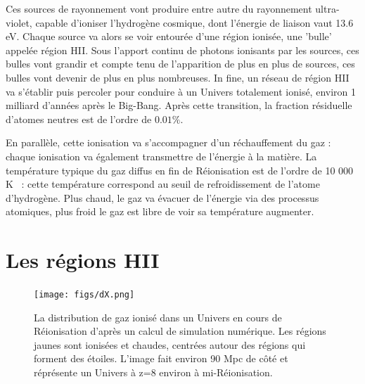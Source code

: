 Ces sources de rayonnement vont produire entre autre du rayonnement ultra-violet, capable d'ioniser l'hydrogène cosmique, dont l'énergie de liaison vaut 13.6 eV. Chaque source va alors se voir entourée d'une région ionisée, une 'bulle' appelée région HII. Sous l'apport continu de photons ionisants par les sources, ces bulles vont grandir et compte tenu de l'apparition de plus en plus de sources, ces bulles vont devenir de plus en plus nombreuses. In fine, un réseau de région HII va s'établir puis percoler pour conduire à un Univers totalement ionisé, environ 1 milliard d'années après le Big-Bang. Après cette transition, la fraction résiduelle d'atomes neutres est de l'ordre de $0.01\%$.

En parallèle, cette ionisation va s'accompagner d'un réchauffement du gaz : chaque ionisation va également transmettre de l'énergie à la matière. La température typique du gaz diffus en fin de Réionisation est de l'ordre de 10 000 K ~: cette température correspond au seuil de refroidissement de l'atome d'hydrogène. Plus chaud, le gaz va évacuer de l'énergie via des processus atomiques, plus froid le gaz est libre de voir sa température augmenter.

\section{Les régions HII}

\begin{figure}[htbp]
	\centering
		\texttt{[image: figs/dX.png]}
		\caption[Le réseau de bulles ionisées de la Réionisation]{La distribution de gaz ionisé dans un Univers en cours de Réionisation d'après un calcul de simulation numérique. Les régions jaunes sont ionisées et chaudes, centrées autour des régions qui forment des étoiles. L'image fait environ 90 Mpc de côté et réprésente un Univers à z=8 environ à mi-Réionisation.}
	\label{f:dX}
\end{figure} 

